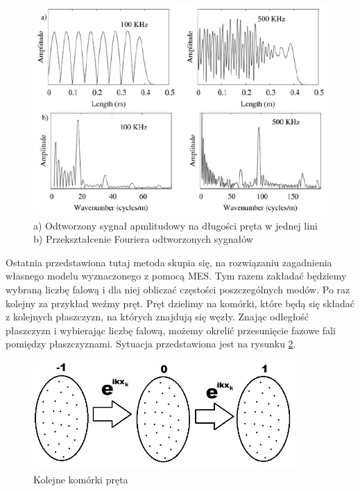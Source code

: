 \begin{figure}[h]
\centering
\includegraphics[width=15cm]{Zdjecia/2/widmo_wymuszenia_szerokopasmowe2a}
\caption{a) Odtworzony sygnał apmlitudowy na długości pręta w jednej lini b) Przekształcenie Fouriera odtworzonych sygnałów \cite{bartek_valsamos}}
\label{fig:szer_odp_przestrzenne}
\end{figure}

\vspace{3mm}

Ostatnia przedstawiona tutaj metoda skupia się, na rozwiązaniu zagadnienia własnego modelu wyznaczonego z pomocą MES. Tym razem zakładać będziemy wybraną liczbę falową i dla niej obliczać częstości poszczególnych modów. 
Po raz kolejny za przykład weźmy pręt. Pręt dzielimy na komórki, które będą się składać z kolejnych płaszczyzn, na których znajdują się węzły. Znając odległość płaszczyzn i wybierając liczbę falową, możemy okrelić przesunięcie fazowe fali pomiędzy płaszczyznami. Sytuacja przedstawiona jest na rysunku \ref{fig:komorki_preta}.


\begin{figure}[h]
\centering
\includegraphics[width=10cm]{Zdjecia/2/metoda_numeryczna3}
\caption{Kolejne komórki pręta}
\label{fig:komorki_preta}
\end{figure}

